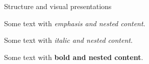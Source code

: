 \documentclass[a4paper, 12pt]{article}
\begin{document}
Structure and visual presentations

Some text with \emph{emphasis and \emph{nested} content}. %

Some text with \textit{italic and \textit{nested} content}. %

Some text with \textbf{bold and \textbf{nested} content}. %
\end{document}
